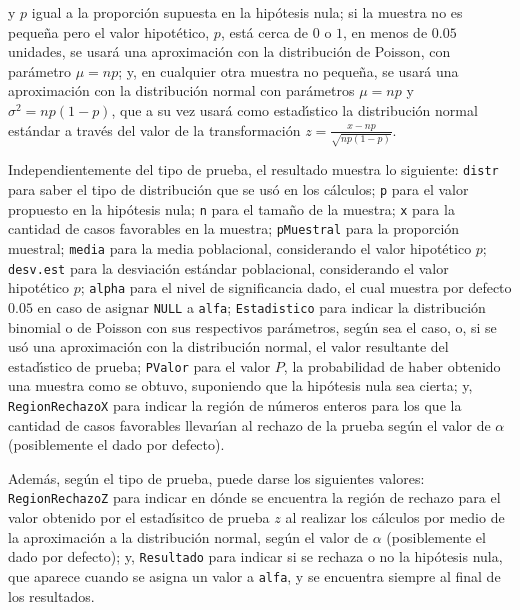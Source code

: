 \begin{solucion}
 y $p$ igual a la proporci\'on supuesta en la hip\'otesis nula;
 si la muestra no es peque\~na pero el valor hipot\'etico, $p$, est\'a cerca
 de $0$ o $1$, en menos de $0.05$ unidades, se usar\'a una aproximaci\'on
 con la distribuci\'on de Poisson, con par\'ametro $\mu = np$;
 y, en cualquier otra muestra no peque\~na, se usar\'a una aproximaci\'on
 con la distribuci\'on normal con par\'ametros $\mu=np$ y $\sigma^2=np(1-p)$,
 que a su vez usar\'a como estad\'{\i}stico la distribuci\'on normal est\'andar
 a trav\'es del valor de la transformaci\'on $z = \frac{x-np}{\sqrt{np(1-p)}}$.
 \par 
 Independientemente del tipo de prueba, el resultado muestra lo siguiente:
 \texttt{distr} para saber el tipo de distribuci\'on que se us\'o en los c\'alculos;
 \texttt{p} para el valor propuesto en la hip\'otesis nula;
 \texttt{n} para el tama\~no de la muestra;
 \texttt{x} para la cantidad de casos favorables en la muestra;
 \texttt{pMuestral} para la proporci\'on muestral;
 \texttt{media} para la media poblacional, considerando el valor hipot\'etico $p$;
 \texttt{desv.est} para la desviaci\'on est\'andar poblacional,
 considerando el valor hipot\'etico $p$;
 \texttt{alpha} para el nivel de significancia dado, el cual muestra por defecto $0.05$
 en caso de asignar \texttt{NULL} a \texttt{alfa};
 \texttt{Estadistico} para indicar la distribuci\'on binomial o de Poisson
 con sus respectivos par\'ametros, seg\'un sea el caso,
 o, si se us\'o una aproximaci\'on con la distribuci\'on normal, el valor resultante
 del estad\'{\i}stico de prueba; \texttt{PValor} para el valor $P$,
 la probabilidad de haber obtenido una muestra como se obtuvo,
 suponiendo que la hip\'otesis nula sea cierta;
 y, \texttt{RegionRechazoX} para indicar la regi\'on de n\'umeros enteros
 para los que la cantidad de casos favorables llevar\'{\i}an al rechazo de la prueba
 seg\'un el valor de $\alpha$ (posiblemente el dado por defecto).
 \par 
 Adem\'as, seg\'un el tipo de prueba, puede darse los siguientes valores:
 \texttt{RegionRechazoZ} para indicar en d\'onde se encuentra la regi\'on de rechazo
 para el valor obtenido por el estad\'{\i}sitco de prueba $z$
 al realizar los c\'alculos por medio de la aproximaci\'on a la distribuci\'on normal,
 seg\'un el valor de $\alpha$ (posiblemente el dado por defecto);
 y, \texttt{Resultado} para indicar si se rechaza o no la hip\'otesis nula,
 que aparece cuando se asigna un valor a \texttt{alfa},
 y se encuentra siempre al final de los resultados.
 \par

\end{solucion}
